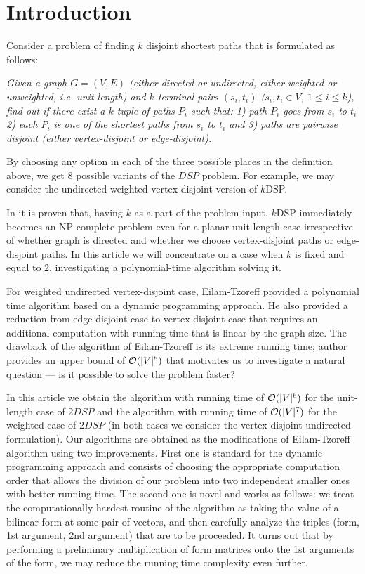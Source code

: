 \section{Introduction}

Consider a problem of finding $k$ disjoint shortest paths that is formulated as follows:

\emph{Given a graph $G = (V, E)$ (either directed or undirected, either weighted or unweighted, i.e. unit-length) and $k$ terminal pairs $(s_i, t_i)$ ($s_i, t_i \in V$, $1 \leq i \leq k$), find out if there exist a $k$-tuple of paths $P_i$ such that: 1) path $P_i$ goes from $s_i$ to $t_i$ 2) each $P_i$ is one of the shortest paths from $s_i$ to $t_i$ and 3) paths are pairwise disjoint (either vertex-disjoint or edge-disjoint).}

By choosing any option in each of the three possible places in the definition above, we get 8 possible variants of the $DSP$ problem. For example, we may consider the undirected weighted vertex-disjoint version of $k$DSP.

In \cite{ET} it is proven that, having $k$ as a part of the problem input, $k$DSP immediately becomes an NP-complete problem even for a planar unit-length case irrespective of whether graph is directed and whether we choose vertex-disjoint paths or edge-disjoint paths. In this article we will concentrate on a case when $k$ is fixed and equal to $2$, investigating a polynomial-time algorithm solving it. 

For weighted undirected vertex-disjoint case, Eilam-Tzoreff provided a polynomial time algorithm based on a dynamic programming approach. He also provided a reduction from edge-disjoint case to vertex-disjoint case that requires an additional computation with running time that is linear by the graph size. The drawback of the algorithm of Eilam-Tzoreff is its extreme running time; author provides an upper bound of  $\mathcal{O}(|V|^8)$ that motivates us to investigate a natural question --- is it possible to solve the problem faster?

In this article we obtain the algorithm with running time of $\mathcal{O}(|V|^6)$ for the unit-length case of $2DSP$ and the algorithm with running time of $\mathcal{O}(|V|^7)$ for the weighted case of $2DSP$ (in both cases we consider the vertex-disjoint undirected formulation). Our algorithms are obtained as the modifications of Eilam-Tzoreff algorithm using two improvements. First one is standard for the dynamic programming approach and consists of choosing the appropriate computation order that allows the division of our problem into two independent smaller ones with better running time. The second one is novel and works as follows: we treat the computationally hardest routine of the algorithm as taking the value of a bilinear form at some pair of vectors, and then carefully analyze the triples (form, 1st argument, 2nd argument) that are to be proceeded. It turns out that by performing a preliminary multiplication of form matrices onto the 1st arguments of the form, we may reduce the running time complexity even further.

